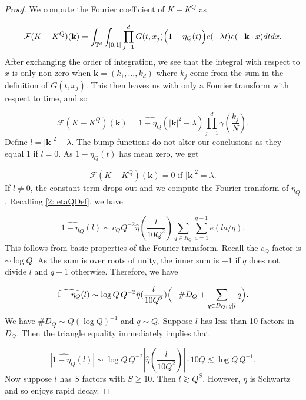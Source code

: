 \documentclass[10pt,a4paper]{amsart}
\newcommand{\T}[1][]{\mathbb{T}^#1}
\newcommand{\bigPara}[1]{\Bigl(#1\Bigr)}
\newcommand{\la}{\lambda}
\begin{document}
\begin{proof}
    We compute the Fourier coefficient of $K-K^Q$ as

    \begin{equation*}
        \mathcal{F}(K-K^Q)(\mathbf{k}) = \int_{\T{d}}\int_{[0,1]}\prod_{j=1}^dG(t,x_j)\bigPara{1-\eta_Q(t)} e(-\la t)e(-\mathbf{k}\cdot x)dtdx.
    \end{equation*}
    After exchanging the order of integration, we see that the integral with respect to $x$ is only non-zero when $\mathbf{k} = (k_1,...,k_d)$ where $k_j$ come from the sum in the definition of $G(t,x_j)$. This then leaves us with only a Fourier transform with respect to time, and so 

    \begin{equation*}
        \mathcal{F}(K-K^Q)(\mathbf{k}) = \widehat{1-\eta_Q}(|\mathbf{k}|^2-\la)\prod_{j=1}^d\gamma(\frac{k_j}{N}).
    \end{equation*}
    Define $l = |\mathbf{k}|^2-\la$. The bump functions do not alter our conclusions as they equal $1$ if $l = 0$. As $1-\eta_Q(t)$ has mean zero, we get

    \begin{equation*}
        \mathcal{F}(K-K^Q)(\mathbf{k}) = 0 \text{ if } |\mathbf{k}|^2=\la.
    \end{equation*}
    If $l\neq 0$, the constant term drops out and we compute the Fourier transform of $\eta_Q$. Recalling \eqref{2: etaQDef}, we have

    \begin{equation}\label{2: FourierTransNumberThrBoundEqn}
        \widehat{1-\eta_Q}(l) \sim c_Q Q^{-2}\hat{\eta}(\frac{l}{10Q^2})\sum_{q\in R_Q}\sum_{a=1}^{q-1}e(la/q).
    \end{equation}
    This follows from basic properties of the Fourier transform. Recall the $c_Q$ factor is $\sim \log Q$. As the sum is over roots of unity, the inner sum is $-1$ if $q$ does not divide $l$ and $q-1$ otherwise. Therefore, we have

    \begin{equation*}
        \widehat{1-\eta_Q}(l) \sim \log Q\, Q^{-2}\hat{\eta}(\frac{l}{10Q^2})\bigPara{-\#D_Q+\sum_{q\in D_Q,\, q|l}q}.
    \end{equation*}
    We have $\#D_Q\sim Q (\log Q)^{-1}$ and $q\sim Q$. Suppose $l$ has less than 10 factors in $D_Q$. Then the triangle equality immediately implies that

    \begin{equation*}
        |\widehat{1-\eta_Q}(l)| \sim \log Q\,Q^{-2}|\hat{\eta}(\frac{l}{10Q^2})|\cdot 10 Q \lesssim \log Q\,Q^{-1}.
    \end{equation*}
    Now suppose $l$ has $S$ factors with $S\geq 10$. Then $l\gtrsim Q^{S}$. However, $\eta$ is Schwartz and so enjoys rapid decay.


\end{proof}
\end{document}

